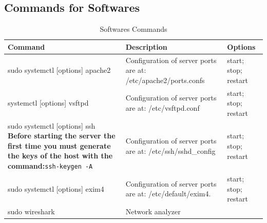 \clearpage
\subsection*{Commands for Softwares}
\begin{table}[H]
	\centering
    \begin{tabular}{|p{6cm}|p{5cm}|p{4cm}|}\hline
        \rowcolor{gray!30}
		\textbf{Command} & \textbf{Description} & \textbf{Options} \\ \hline
		
        sudo systemctl [options] apache2
            & Configuration of server ports are at: \newline /etc/apache2/ports.confs
            & start; stop; restart
        \\ \hline

        systemctl [options] vsftpd
            & Configuration of server ports are at: \newline /etc/vsftpd.conf
            & start; stop; restart
        \\ \hline

        sudo systemctl [options] ssh \newline \newline \textbf{Before starting the server the first time you must generate the keys of the host with the command:}\newline \texttt{ssh-keygen -A}
            & Configuration of server ports are at: \newline /etc/ssh/sshd\_config
            & start; stop; restart
        \\ \hline

        sudo systemctl [options] exim4
            & Configuration of server ports are at: \newline /etc/default/exim4.
            & start; stop; restart
        \\ \hline

        sudo wireshark 
            & Network analyzer 
            & 
        \\ \hline

    \end{tabular}

    \caption{Softwares Commands}

    \label{tab:softwareCommands}
\end{table}

